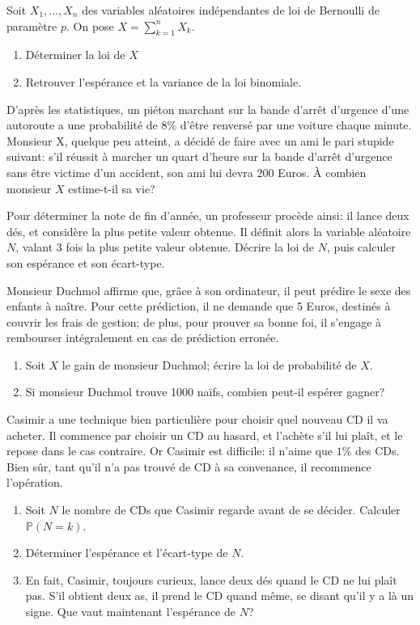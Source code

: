 \documentclass{yann}
\begin{document}
\Exercice

Soit $X_1, \dots, X_n$ des variables aléatoires indépendantes de loi de Bernoulli de paramètre $p$.
On pose $X = ∑_{k=1}^n X_k$.
\begin{enumerate}
\item
  Déterminer la loi de $X$
\item
  Retrouver l'espérance et la variance de la loi binomiale.
\end{enumerate}

\Exercice

D'après les statistiques, un piéton marchant sur la bande d'arrêt
d'urgence d'une autoroute a une probabilité de $8\%$ d'être renversé
par une voiture chaque minute.
Monsieur X, quelque peu atteint, a décidé de faire avec un ami
le pari stupide suivant:
s'il réussit à marcher un quart d'heure sur la bande d'arrêt d'urgence
sans être victime d'un accident, son ami lui devra $200$ Euros.
À combien monsieur $X$ estime-t-il sa vie?

\Exercice

Pour déterminer la note de fin d'année, un professeur procède ainsi:
il lance deux dés, et considère la plus petite valeur obtenue.
Il définit alors la variable aléatoire $N$, valant $3$ fois la
plus petite valeur obtenue.
Décrire la loi de $N$, puis calculer son espérance et son écart-type.

\Exercice

Monsieur Duchmol affirme que, grâce à son ordinateur, il peut prédire
le sexe des enfants à naître. Pour cette prédiction, il ne demande que
5 Euros, destinés à couvrir les frais de gestion; de plus, pour
\og{}prouver\fg{} sa bonne foi, il s'engage à rembourser intégralement
en cas de prédiction erronée.
\begin{enumerate}
\item
  Soit $X$ le gain de monsieur Duchmol; écrire la loi de probabilité de $X$.
\item
  Si monsieur Duchmol trouve 1000 naïfs, combien peut-il espérer gagner?
\end{enumerate}

\Exercice

Casimir a une technique bien particulière pour choisir quel nouveau CD il va acheter.
Il commence par choisir un CD au hasard, et l'achète s'il lui plaît,
et le repose dans le cas contraire.
Or Casimir est difficile: il n'aime que $1\%$ des CDs.
Bien sûr, tant qu'il n'a pas trouvé de CD à sa convenance, il recommence l'opération.
\begin{enumerate}
\item
  Soit $N$ le nombre de CDs que Casimir regarde avant de se décider.
  Calculer $ℙ(N=k)$.
\item
  Déterminer l'espérance et l'écart-type de $N$.
\item
  En fait, Casimir, toujours curieux, lance deux dés quand le CD ne lui plaît pas.
  S'il obtient deux as, il prend le CD quand même, se disant qu'il y a là
  un signe. Que vaut maintenant l'espérance de $N$?
\end{enumerate}
\end{document}
